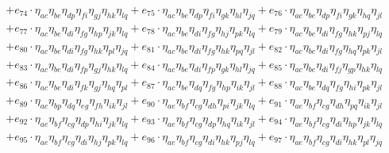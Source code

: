 \begin{itemize}
{\begin{minipage}[t]{\linewidth}
\begin{align}
    & + e_{74} \cdot \eta_{a c} \eta_{b e} \eta_{d p} \eta_{f i} \eta_{g j} \eta_{h k} \eta_{l q} + e_{75} \cdot \eta_{a c} \eta_{b e} \eta_{d p} \eta_{f i} \eta_{g k} \eta_{h l} \eta_{j q} + e_{76} \cdot \eta_{a c} \eta_{b e} \eta_{d p} \eta_{f i} \eta_{g k} \eta_{h q} \eta_{j l} \nonumber \\
    & + e_{77} \cdot \eta_{a c} \eta_{b e} \eta_{d i} \eta_{f g} \eta_{h p} \eta_{j k} \eta_{l q} + e_{78} \cdot \eta_{a c} \eta_{b e} \eta_{d i} \eta_{f g} \eta_{h j} \eta_{p k} \eta_{l q} + e_{79} \cdot \eta_{a c} \eta_{b e} \eta_{d i} \eta_{f g} \eta_{h k} \eta_{p j} \eta_{l q} \nonumber \\
    & + e_{80} \cdot \eta_{a c} \eta_{b e} \eta_{d i} \eta_{f g} \eta_{h k} \eta_{p l} \eta_{j q} + e_{81} \cdot \eta_{a c} \eta_{b e} \eta_{d i} \eta_{f g} \eta_{h k} \eta_{p q} \eta_{j l} + e_{82} \cdot \eta_{a c} \eta_{b e} \eta_{d i} \eta_{f g} \eta_{h q} \eta_{p k} \eta_{j l} \nonumber \\
    & + e_{83} \cdot \eta_{a c} \eta_{b e} \eta_{d i} \eta_{f p} \eta_{g j} \eta_{h k} \eta_{l q} + e_{84} \cdot \eta_{a c} \eta_{b e} \eta_{d i} \eta_{f p} \eta_{g k} \eta_{h l} \eta_{j q} + e_{85} \cdot \eta_{a c} \eta_{b e} \eta_{d i} \eta_{f j} \eta_{g p} \eta_{h k} \eta_{l q} \nonumber \\
    & + e_{86} \cdot \eta_{a c} \eta_{b e} \eta_{d i} \eta_{f k} \eta_{g j} \eta_{h q} \eta_{p l} + e_{87} \cdot \eta_{a c} \eta_{b e} \eta_{d q} \eta_{f g} \eta_{h p} \eta_{i k} \eta_{j l} + e_{88} \cdot \eta_{a c} \eta_{b e} \eta_{d q} \eta_{f g} \eta_{h i} \eta_{p k} \eta_{j l} \nonumber \\
    & + e_{89} \cdot \eta_{a c} \eta_{b p} \eta_{d q} \eta_{e g} \eta_{f h} \eta_{i k} \eta_{j l} + e_{90} \cdot \eta_{a e} \eta_{b f} \eta_{c g} \eta_{d h} \eta_{p i} \eta_{j k} \eta_{l q} + e_{91} \cdot \eta_{a e} \eta_{b f} \eta_{c g} \eta_{d h} \eta_{p q} \eta_{i k} \eta_{j l} \nonumber \\
    & + e_{92} \cdot \eta_{a e} \eta_{b f} \eta_{c g} \eta_{d p} \eta_{h i} \eta_{j k} \eta_{l q} + e_{93} \cdot \eta_{a e} \eta_{b f} \eta_{c g} \eta_{d p} \eta_{h q} \eta_{i k} \eta_{j l} + e_{94} \cdot \eta_{a e} \eta_{b f} \eta_{c g} \eta_{d i} \eta_{h p} \eta_{j k} \eta_{l q} \nonumber \\
    & + e_{95} \cdot \eta_{a e} \eta_{b f} \eta_{c g} \eta_{d i} \eta_{h j} \eta_{p k} \eta_{l q} + e_{96} \cdot \eta_{a e} \eta_{b f} \eta_{c g} \eta_{d i} \eta_{h k} \eta_{p j} \eta_{l q} + e_{97} \cdot \eta_{a e} \eta_{b f} \eta_{c g} \eta_{d i} \eta_{h k} \eta_{p l} \eta_{j q} \nonumber \\

\end{align}
\end{minipage}}
\end{itemize}
